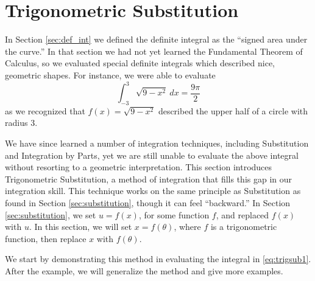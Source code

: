 \section{Trigonometric Substitution}\label{sec:trig_sub}

In Section \ref{sec:def_int} we defined the definite integral as the ``signed area under the curve.'' In that section we had not yet learned the Fundamental Theorem of Calculus, so we evaluated special definite integrals which described nice, geometric shapes. For instance, we were able to evaluate
\begin{equation}
\int_{-3}^3\sqrt{9-x^2}\ dx = \frac{9\pi}{2}\label{eq:trigsub1}
\end{equation}
 as we recognized that $f(x) = \sqrt{9-x^2}$ described the upper half of a circle with radius 3. 

We have since learned a number of integration techniques, including Substitution and Integration by Parts, yet we are still unable to evaluate the above integral without resorting to a geometric interpretation. This section introduces Trigonometric Substitution, a method of integration that fills this gap in our integration skill. This technique works on the same principle as Substitution as found in Section \ref{sec:substitution}, though it can feel ``backward.'' In Section \ref{sec:substitution}, we set $u=f(x)$, for some function $f$, and replaced $f(x)$ with $u$. In this section, we will set $x=f(\theta)$, where $f$ is a trigonometric function, then replace $x$ with $f(\theta)$. 

We start by demonstrating this method in evaluating the integral in \eqref{eq:trigsub1}. After the example, we will generalize the method and give more examples.\\
\enlargethispage{3\baselineskip}

